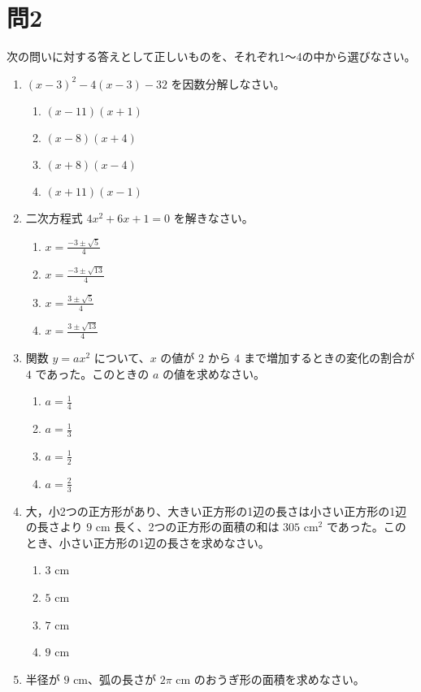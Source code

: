 \documentclass{ltjsarticle}
\begin{document}
\section*{問2}
次の問いに対する答えとして正しいものを、それぞれ1～4の中から選びなさい。

\begin{enumerate}
    \item $(x - 3)^2 - 4(x - 3) - 32$ を因数分解しなさい。
    \begin{enumerate}
        \item $(x - 11)(x + 1)$ \quad \item $(x - 8)(x + 4)$ \quad \item $(x + 8)(x - 4)$ \quad \item $(x + 11)(x - 1)$
    \end{enumerate}
    \item 二次方程式 $4x^2 + 6x + 1 = 0$ を解きなさい。
    \begin{enumerate}
        \item $x = \frac{-3 \pm \sqrt{5}}{4}$ \quad \item $x = \frac{-3 \pm \sqrt{13}}{4}$ \quad \item $x = \frac{3 \pm \sqrt{5}}{4}$ \quad \item $x = \frac{3 \pm \sqrt{13}}{4}$
    \end{enumerate}
    \item 関数 $y = ax^2$ について、$x$ の値が $2$ から $4$ まで増加するときの変化の割合が $4$ であった。このときの $a$ の値を求めなさい。
    \begin{enumerate}
        \item $a = \frac{1}{4}$ \quad \item $a = \frac{1}{3}$ \quad \item $a = \frac{1}{2}$ \quad \item $a = \frac{2}{3}$
    \end{enumerate}
    \item 大，小2つの正方形があり、大きい正方形の1辺の長さは小さい正方形の1辺の長さより $9$ cm 長く、2つの正方形の面積の和は $305$ cm$^2$ であった。このとき、小さい正方形の1辺の長さを求めなさい。
    \begin{enumerate}
        \item $3$ cm \quad \item $5$ cm \quad \item $7$ cm \quad \item $9$ cm
    \end{enumerate}
    \item 半径が $9$ cm、弧の長さが $2\pi$ cm のおうぎ形の面積を求めなさい。

\end{enumerate}
\end{document}
